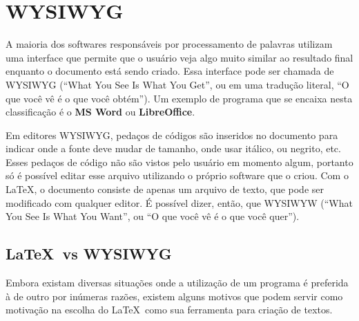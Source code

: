 \section{WYSIWYG}

A maioria dos softwares responsáveis por processamento de palavras utilizam uma interface que permite que o usuário veja algo muito similar ao resultado final enquanto o documento está sendo criado. Essa interface pode ser chamada de WYSIWYG (``What You See Is What You Get'', ou em uma tradução literal, ``O que você vê é o que você obtém''). Um exemplo de programa que se encaixa nesta classificação é o \textbf{MS Word} ou \textbf{LibreOffice}.

Em editores WYSIWYG, pedaços de códigos são inseridos no documento para indicar onde a fonte deve mudar de tamanho, onde usar itálico, ou negrito, etc. Esses pedaços de código não são vistos pelo usuário em momento algum, portanto só é possível editar esse arquivo utilizando o próprio software que o criou. Com o \LaTeX, o documento consiste de apenas um arquivo de texto, que pode ser modificado com qualquer editor. É possível dizer, então, que WYSIWYW (``What You See Is What You Want'', ou ``O que você vê é o que você quer'').

\subsection{\LaTeX\ vs WYSIWYG}%
Embora existam diversas situações onde a utilização de um programa é preferida à de outro por inúmeras razões, existem alguns motivos que podem servir como motivação na escolha do \LaTeX\ como sua ferramenta para criação de textos.

